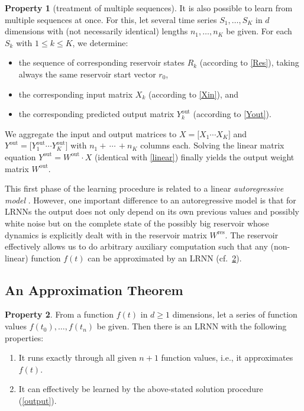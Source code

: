\documentclass[twoside,11pt]{article}
\theoremstyle{definition}
\newtheorem{prop}{Property}
\begin{document}
\begin{prop}[treatment of multiple sequences]\label{multi}
It is also possible to learn from multiple sequences at once. For this, let
several time series $S_1,\dots,S_K$ in $d$ dimensions with (not necessarily
identical) lengths $n_1,\dots,n_K$ be given. For each $S_k$ with $1 \le k \le
K$, we determine:
\begin{itemize}
  \item the sequence of corresponding reservoir states $R_k$ (according to
	\cref{Res}), taking always the same reservoir start vector $r_0$,
  \item the corresponding input matrix $X_k$ (according to \cref{Xin}), and
  \item the corresponding predicted output matrix $Y^\mathrm{out}_k$ (according to \cref{Yout}).
\end{itemize}
We aggregate the input and output matrices to $X = \big[ X_1 \cdots X_K \big]$
and $Y^\mathrm{out} = \big[ Y^\mathrm{out}_1 \cdots Y^\mathrm{out}_K \big]$ with
$n_1+\,\cdots\,+n_K$ columns each. Solving the linear matrix equation
$Y^\mathrm{out} = W^\mathrm{out} \cdot X$ (identical with \cref{linear})
finally yields the output weight matrix $W^\mathrm{out}$.
\end{prop}

This first phase of the learning procedure is related to a linear
\emph{autoregressive model} \citep{Aka69}. However, one important
difference to an autoregressive model is that for LRNNs the output does not only
depend on its own previous values and possibly white noise but on the complete
state of the possibly big reservoir whose dynamics is explicitly dealt with in
the reservoir matrix $W^\mathrm{res}$. The reservoir effectively allows us to do
arbitrary auxiliary computation such that any (non-linear) function $f(t)$ can
be approximated by an LRNN (cf.~\cref{approx}).

\subsection{An Approximation Theorem}

\begin{prop}\label{approx}
From a function $f(t)$ in $d \ge 1$ dimensions, let a
series of function values $f(t_0),\dots,f(t_n)$ be given. Then there is an
LRNN with the following properties:
\begin{enumerate}
  \item It runs exactly through all given $n+1$ function values, i.e., it approximates $f(t)$.
  \item It can effectively be learned by the above-stated solution procedure (\cref{output}).
\end{enumerate}
\end{prop}
\end{document}
